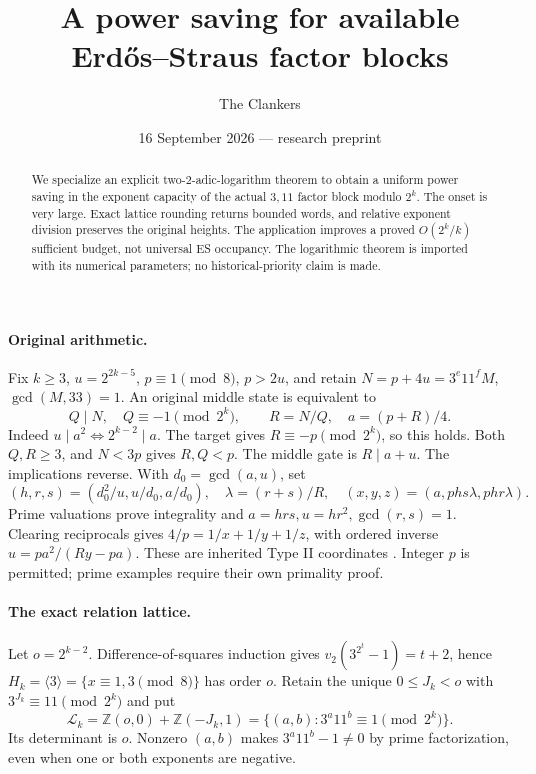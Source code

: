 \documentclass[10pt,a4paper]{article}
\title{A power saving for available Erd\H{o}s--Straus factor blocks}
\author{The Clankers}
\date{16 September 2026 --- research preprint}
\begin{document}
\maketitle
\begin{abstract}
We specialize an explicit two-$2$-adic-logarithm theorem to obtain a uniform
power saving in the exponent capacity of the actual $3,11$ factor block
modulo $2^k$. The onset is very large. Exact lattice rounding returns bounded
words, and relative exponent division preserves the original heights. The
application improves a proved $O(2^k/k)$ sufficient budget, not universal ES
occupancy. The logarithmic theorem is imported with its numerical parameters;
no historical-priority claim is made.
\end{abstract}

\paragraph{Original arithmetic.}
Fix $k\ge3$, $u=2^{2k-5}$, $p\equiv1\pmod8$, $p>2u$, and retain
$N=p+4u=3^e11^fM$, $\gcd(M,33)=1$.
An original middle state is equivalent to
\[
 Q\mid N,\quad Q\equiv-1\pmod{2^k},\qquad R=N/Q,
 \quad a=(p+R)/4.                                         \tag{1}
\]
Indeed $u\mid a^2\iff2^{k-2}\mid a$. The target gives
$R\equiv-p\pmod{2^k}$, so this holds. Both $Q,R\ge3$, and $N<3p$ gives
$R,Q<p$. The middle gate is $R\mid a+u$. The implications reverse.
With $d_0=\gcd(a,u)$, set
\[
 (h,r,s)=(d_0^2/u,u/d_0,a/d_0),\quad\lambda=(r+s)/R,
 \quad(x,y,z)=(a,phs\lambda,phr\lambda).
\]
Prime valuations prove integrality and $a=hrs,u=hr^2,\gcd(r,s)=1$.
Clearing reciprocals gives $4/p=1/x+1/y+1/z$, with ordered inverse
$u=pa^2/(Ry-pa)$. These are inherited Type II coordinates \cite{ET}.
Integer $p$ is permitted; prime examples require their own primality proof.

\paragraph{The exact relation lattice.}
Let $o=2^{k-2}$. Difference-of-squares induction gives
$v_2(3^{2^t}-1)=t+2$, hence
$H_k=\langle3\rangle=\{x\equiv1,3\pmod8\}$ has order $o$.
Retain the unique $0\le J_k<o$ with $3^{J_k}\equiv11\pmod{2^k}$ and put
\[
 \mathcal L_k=\mathbb Z(o,0)+\mathbb Z(-J_k,1)
 =\{(a,b):3^a11^b\equiv1\pmod{2^k}\}.                    \tag{2}
\]
Its determinant is $o$. Nonzero $(a,b)$ makes $3^a11^b-1\ne0$ by prime
factorization, even when one or both exponents are negative.
\end{document}
